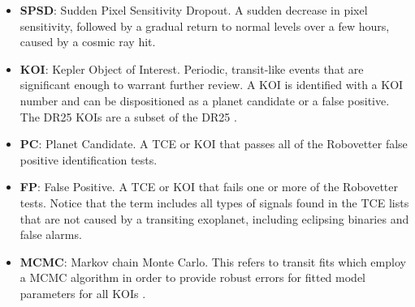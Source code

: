 \begin{itemize}
\item[] \textbf{SPSD}: Sudden Pixel Sensitivity Dropout.  A sudden decrease in pixel sensitivity, followed by a gradual return to normal levels over a few hours, caused by a cosmic ray hit.
\item[] \textbf{KOI}: Kepler Object of Interest. Periodic, transit-like events that are significant enough to warrant further review. A KOI is identified with a KOI number and can be dispositioned as a planet candidate or a false positive. The DR25 KOIs are a subset of the DR25 .
\item[] \textbf{PC}: Planet Candidate. A TCE or KOI that passes all of the Robovetter false positive identification tests. 
\item[] \textbf{FP}: False Positive. A TCE or KOI that fails one or more of the Robovetter tests. Notice that the term includes all types of signals found in the TCE lists that are not caused by a transiting exoplanet, including eclipsing binaries and false alarms.
\item[] \textbf{MCMC}: Markov chain Monte Carlo. This refers to transit fits which employ a MCMC algorithm in order to provide robust errors for fitted model parameters for all KOIs
 \citep{Hoffman2017}.



\end{itemize}